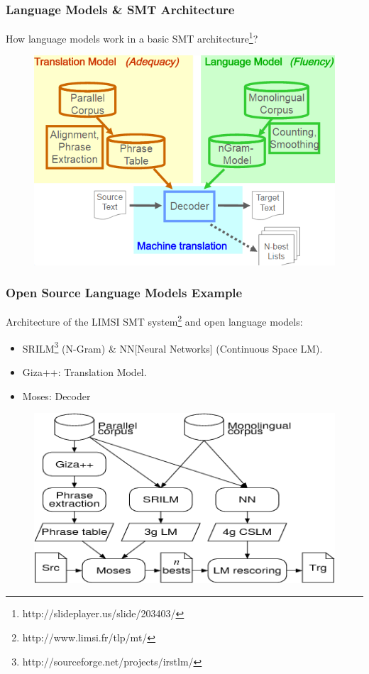\documentclass{beamer}
\begin{document}

\begin{frame} \frametitle{Language Models \& SMT Architecture}
How language models work in a basic SMT architecture\footnote{http://slideplayer.us/slide/203403/}?
\begin{figure}
\includegraphics[width=0.6\linewidth]{figure/statml_architecture.PNG}
\label{fig:statml_architecture}
\end{figure}
\end{frame}


\begin{frame} \frametitle{Open Source Language Models Example}
Architecture of the LIMSI SMT
system\footnote{http://www.limsi.fr/tlp/mt/} and open language models:
\begin{itemize}
\item SRILM\footnote{http://sourceforge.net/projects/irstlm/} (N-Gram)
  \& NN[Neural Networks] (Continuous Space LM).
\item Giza++: Translation Model. 
\item Moses: Decoder
\end{itemize}
\begin{figure}
\includegraphics[width=0.6\linewidth]{figure/TLP_SMT_arch.png}
\label{fig:TLP_SMT_arch}
\end{figure}
\end{frame}
\end{document}
